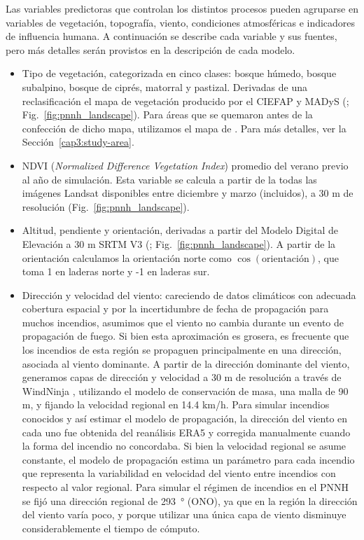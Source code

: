 Las variables predictoras que controlan los distintos procesos pueden agruparse en variables de vegetación, topografía, viento, condiciones atmosféricas e indicadores de influencia humana. A continuación se describe cada variable y sus fuentes, pero más detalles serán provistos en la descripción de cada modelo.

\begin{itemize}
    \item Tipo de vegetación, categorizada en cinco clases: bosque húmedo, bosque subalpino, bosque de ciprés, matorral y pastizal. Derivadas de una reclasificación el mapa de vegetación producido por el CIEFAP y MADyS (\citealt{mapa_ciefap}; Fig.~\ref{fig:pnnh_landscape}). Para áreas que se quemaron antes de la confección de dicho mapa, utilizamos el mapa de \citealt{lara_vegetacion_1999}. Para más detalles, ver la Sección~\ref{cap3:study-area}.
    \item NDVI (\textit{Normalized Difference Vegetation Index}) promedio del verano previo al año de simulación. Esta variable se calcula a partir de la todas las imágenes Landsat disponibles entre diciembre y marzo (incluidos), a 30 m de resolución (Fig.~\ref{fig:pnnh_landscape}).
    \item Altitud, pendiente y orientación, derivadas a partir del Modelo Digital de Elevación a 30 m SRTM V3 (\citealt{DEMfarr2007}; Fig.~\ref{fig:pnnh_landscape}). A partir de la orientación calculamos la orientación norte como $\cos(\text{orientación})$, que toma 1 en laderas norte y -1 en laderas sur.
    \item Dirección y velocidad del viento: careciendo de datos climáticos con adecuada cobertura espacial y por la incertidumbre de fecha de propagación para muchos incendios, asumimos que el viento no cambia durante un evento de propagación de fuego. Si bien esta aproximación es grosera, es frecuente que los incendios de esta región se propaguen principalmente en una dirección, asociada al viento dominante. A partir de la dirección dominante del viento, generamos capas de dirección y velocidad a 30 m de resolución a través de WindNinja \citep{forthofer2007windNinja}, utilizando el modelo de conservación de masa, una malla de 90 m, y fijando la velocidad regional en 14.4 km/h. Para simular incendios conocidos y así estimar el modelo de propagación, la dirección del viento en cada uno fue obtenida del reanálisis ERA5 \citep{hersbach2020era5} y corregida manualmente cuando la forma del incendio no concordaba. Si bien la velocidad regional se asume constante, el modelo de propagación estima un parámetro para cada incendio que representa la variabilidad en velocidad del viento entre incendios con respecto al valor regional. Para simular el régimen de incendios en el PNNH se fijó una dirección regional de 293~° (ONO), ya que en la región la dirección del viento varía poco, y porque utilizar una única capa de viento disminuye considerablemente el tiempo de cómputo. 

\end{itemize}
